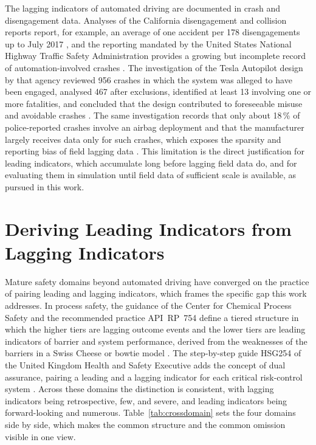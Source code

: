 The lagging indicators of automated driving are documented in crash and disengagement
data. Analyses of the California disengagement and collision reports report, for
example, an average of one accident per 178 disengagements up to July 2017
\cite{favaro2018}, and the reporting mandated by the United States National Highway
Traffic Safety Administration provides a growing but incomplete record of
automation-involved crashes \cite{nhtsa_sgo}. The investigation of the Tesla Autopilot design by
that agency reviewed 956 crashes in which the system was alleged to have been engaged,
analysed 467 after exclusions, identified at least 13 involving one or more
fatalities, and concluded that the design contributed to foreseeable misuse and
avoidable crashes \cite{nhtsa_ea22002}. The same investigation records that only about
18\,\% of police-reported crashes involve an airbag deployment and that the
manufacturer largely receives data only for such crashes, which exposes the sparsity
and reporting bias of field lagging data \cite{nhtsa_ea22002}. This limitation is the
direct justification for leading indicators, which accumulate long before lagging
field data do, and for evaluating them in simulation until field data of sufficient
scale is available, as pursued in this work.

\section{Deriving Leading Indicators from Lagging Indicators}
\label{sec:sota_derivation}

Mature safety domains beyond automated driving have converged on the practice of
pairing leading and lagging indicators, which frames the specific gap this work
addresses. In process safety, the guidance of the Center for Chemical Process Safety
and the recommended practice API~RP~754 define a tiered structure in which the higher
tiers are lagging outcome events and the lower tiers are leading indicators of barrier
and system performance, derived from the weaknesses of the barriers in a Swiss Cheese
or bowtie model \cite{ccps2018metrics,apirp754}. The step-by-step guide HSG254 of the
United Kingdom Health and Safety Executive adds the concept of dual assurance, pairing
a leading and a lagging indicator for each critical risk-control system
\cite{hse2006hsg254}. Across these domains the distinction is consistent, with lagging
indicators being retrospective, few, and severe, and leading indicators being
forward-looking and numerous. Table~\ref{tab:crossdomain} sets the four domains side by
side, which makes the common structure and the common omission visible in one view.

